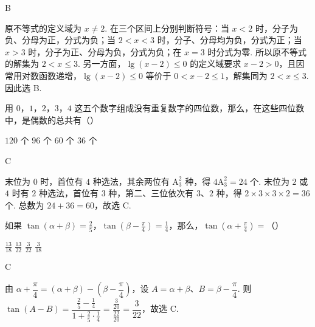 \documentclass[UTF8,a4paper,oneside,11pt]{ctexbook}
\begin{document}
\begin{answer}
B
\end{answer}

\begin{solution}
原不等式的定义域为 \(x\ne2\). 在三个区间上分别判断符号：当 \(x<2\) 时，分子为负、分母为正，分式为负；当 \(2<x<3\) 时，分子、分母均为负，分式为正；当 \(x>3\) 时，分子为正、分母为负，分式为负；在 \(x=3\) 时分式为零. 所以原不等式的解集为 \(2<x\leqslant3\). 另一方面，\(\lg(x-2)\leqslant0\) 的定义域要求 \(x-2>0\)，且因常用对数函数递增，\(\lg(x-2)\leqslant0\) 等价于 \(0<x-2\leqslant1\)，解集同为 \(2<x\leqslant3\). 因此选 B.
\end{solution}

\begin{problem}
用 \(0\)，\(1\)，\(2\)，\(3\)，\(4\) 这五个数字组成没有重复数字的四位数，那么，在这些四位数中，是偶数的总共有（\quad）

\choices
    {\(120\) 个}
    {\(96\) 个}
    {\(60\) 个}
    {\(36\) 个}
\end{problem}

\begin{answer}
C
\end{answer}

\begin{solution}
末位为 \(0\) 时，首位有 \(4\) 种选法，其余两位有 \(\mathrm A_3^2\) 种，得 \(4\mathrm A_3^2=24\) 个. 末位为 \(2\) 或 \(4\) 时有 \(2\) 种选法，首位有 \(3\) 种，第二、三位依次有 \(3\)、\(2\) 种，得 \(2\times3\times3\times2=36\) 个. 总数为 \(24+36=60\)，故选 C.
\end{solution}

\begin{problem}
如果 \(\tan(\alpha + \beta) = \frac{2}{5}\)，\(\tan\left(\beta - \frac{\pi}{4}\right) = \frac{1}{4}\)，那么，\(\tan\left(\alpha + \frac{\pi}{4}\right)=\)（\quad）

\choices
    {\(\frac{13}{18}\)}
    {\(\frac{13}{22}\)}
    {\(\frac{3}{22}\)}
    {\(\frac{3}{18}\)}
\end{problem}

\begin{answer}
C
\end{answer}

\begin{solution}
由 \(\alpha+\dfrac\pi4=(\alpha+\beta)-\left(\beta-\dfrac\pi4\right)\)，设 \(A=\alpha+\beta\)、\(B=\beta-\dfrac\pi4\). 则
\(\tan(A-B)=\dfrac{\frac25-\frac14}{1+\frac25\cdot\frac14}=\dfrac{\frac{3}{20}}{\frac{22}{20}}=\dfrac3{22}\)，故选 C.
\end{solution}
\end{document}
